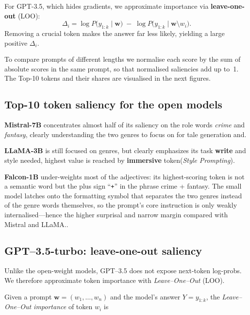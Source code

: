 \documentclass[12pt]{article}
\begin{document}
For GPT-3.5, which hides gradients, we approximate importance via
\textbf{leave-one-out} (LOO):
\[
  \Delta_i
   = \log P\bigl(y_{1:k}\mid\mathbf{w}\bigr)
     \;-\;
     \log P\!\bigl(y_{1:k}\mid\mathbf{w}{\setminus}w_i\bigr).
\]
Removing a crucial token makes the answer far less likely, yielding a
large positive $\Delta_i$.

To compare prompts of different lengths we normalise each score by the
sum of absolute scores in the same prompt, so that normalised saliencies
add up to~1.  The Top-10 tokens and their shares are visualised in the
next figures.


\subsection{Top-10 token saliency for the open models}

\textbf{Mistral-7B} concentrates almost half of its saliency on the role words \textit{crime} and \textit{fantasy}, clearly understanding the two genres to focus on for tale generation and.


\noindent \textbf{LLaMA-3B} is still focused on genres, but clearly emphasizes its task \textbf{write} and style needed, highest value is reached by \textbf{immersive} token(\emph{Style Prompting}).

\noindent \textbf{Falcon-1B} under-weights most of the adjectives: its highest-scoring token is not a semantic word but the plus sign “\texttt{+}” in the phrase crime + fantasy.
The small model latches onto the formatting symbol that separates the two genres instead of the genre words themselves, so the prompt’s core instruction is only weakly internalised—hence the higher surprisal and narrow margin compared with Mistral and LLaMA..

\subsection{GPT--3.5-turbo: leave-one-out saliency}
\label{sec:gpt35_loo}

Unlike the open-weight models, GPT--3.5 does not expose next-token
log-probs.  
We therefore approximate token importance with
\emph{Leave–One–Out} (LOO).

Given a prompt $\mathbf{w}= (w_1,\dots,w_n)$ and the model’s answer
$Y=y_{1:k}$, the \emph{Leave–One–Out importance} of token $w_i$ is
\end{document}
